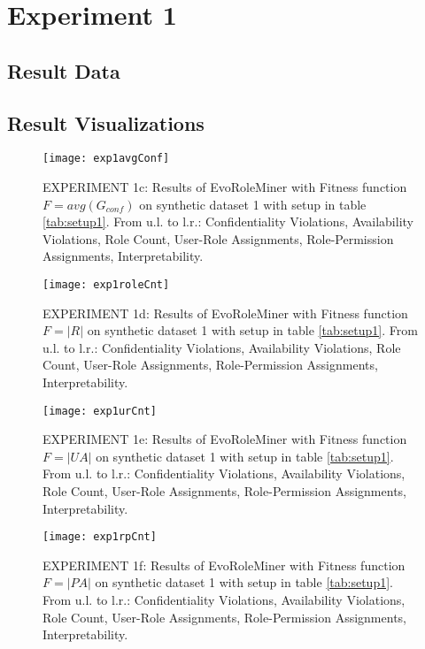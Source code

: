 \newpage
\section{Experiment 1}
\label{sec:A_Exp1}
	\subsection{Result Data}
	\label{sec:A_Exp1_Data}
	\subsection{Result Visualizations}
	\label{sec:A_Exp1_Diagrams}
		\begin{figure}[H]
			\centering
		    \texttt{[image: exp1avgConf]}
		    \caption{EXPERIMENT 1c: Results of EvoRoleMiner with Fitness function $F=avg(G_{conf})$ on synthetic dataset 1 with setup in table \ref{tab:setup1}. From u.l. to l.r.: Confidentiality Violations, Availability Violations, Role Count, User-Role Assignments, Role-Permission Assignments, Interpretability.}
		    \label{fig:exp1avgConf}
		\end{figure}
		
		\begin{figure}[H]
			\centering
		    \texttt{[image: exp1roleCnt]}
		    \caption{EXPERIMENT 1d: Results of EvoRoleMiner with Fitness function $F=|R|$ on synthetic dataset 1 with setup in table \ref{tab:setup1}. From u.l. to l.r.: Confidentiality Violations, Availability Violations, Role Count, User-Role Assignments, Role-Permission Assignments, Interpretability.}
		    \label{fig:exp1roleCnt}
		\end{figure}
		
		\begin{figure}[H]
			\centering
		    \texttt{[image: exp1urCnt]}
		    \caption{EXPERIMENT 1e: Results of EvoRoleMiner with Fitness function $F=|UA|$ on synthetic dataset 1 with setup in table \ref{tab:setup1}. From u.l. to l.r.: Confidentiality Violations, Availability Violations, Role Count, User-Role Assignments, Role-Permission Assignments, Interpretability.}
		    \label{fig:exp1urCnt}
		\end{figure}
		
		\begin{figure}[H]
		    \centering
		    \texttt{[image: exp1rpCnt]}
	    	\caption{EXPERIMENT 1f: Results of EvoRoleMiner with Fitness function $F=|PA|$ on synthetic dataset 1 with setup in table \ref{tab:setup1}. From u.l. to l.r.: Confidentiality Violations, Availability Violations, Role Count, User-Role Assignments, Role-Permission Assignments, Interpretability.}
	    	\label{fig:exp1rpCnt}
	    \end{figure}
	
